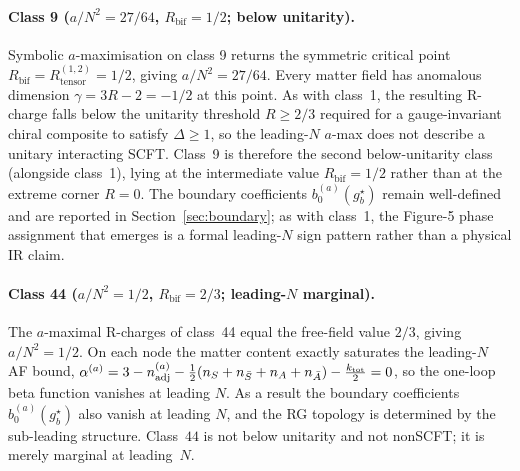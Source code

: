 \paragraph{Class 9 ($a/N^{2}=27/64$, $R_{\text{bif}}=1/2$; below unitarity).}
Symbolic $a$-maximisation on class 9 returns the symmetric critical
point $R_{\text{bif}}=R_{\text{tensor}}^{(1,2)}=1/2$, giving
$a/N^{2}=27/64$.  Every matter field has anomalous dimension
$\gamma=3R-2=-1/2$ at this point.  As with class~1, the resulting
R-charge falls below the unitarity threshold $R\ge 2/3$ required for
a gauge-invariant chiral composite to satisfy $\Delta\ge 1$, so the
leading-$N$ $a$-max does not describe a unitary interacting SCFT.
Class~9 is therefore the second below-unitarity class (alongside
class~1), lying at the intermediate value $R_{\text{bif}}=1/2$ rather
than at the extreme corner $R=0$.  The boundary coefficients
$b_{0}^{(a)}(g_{b}^{\star})$ remain well-defined and are reported in
Section~\ref{sec:boundary}; as with class~1, the Figure-5 phase
assignment that emerges is a formal leading-$N$ sign pattern rather
than a physical IR claim.

\paragraph{Class 44 ($a/N^{2}=1/2$, $R_{\text{bif}}=2/3$; leading-$N$ marginal).}
The $a$-maximal R-charges of class~44 equal the free-field value
$2/3$, giving $a/N^{2}=1/2$.  On each node the matter content exactly
saturates the leading-$N$ AF bound,
$\alpha^{(a)}=3-n_{\mathrm{adj}}^{(a)}-\tfrac{1}{2}(n_{S}+n_{\bar S}+n_{A}+n_{\bar A})
-\tfrac{k_{\text{tot}}}{2}=0$, so the one-loop beta function vanishes
at leading $N$.  As a result the boundary coefficients
$b_{0}^{(a)}(g_{b}^{\star})$ also vanish at leading $N$, and the RG
topology is determined by the sub-leading structure.  Class~$44$ is
not below unitarity and not nonSCFT; it is merely marginal at
leading~$N$.

